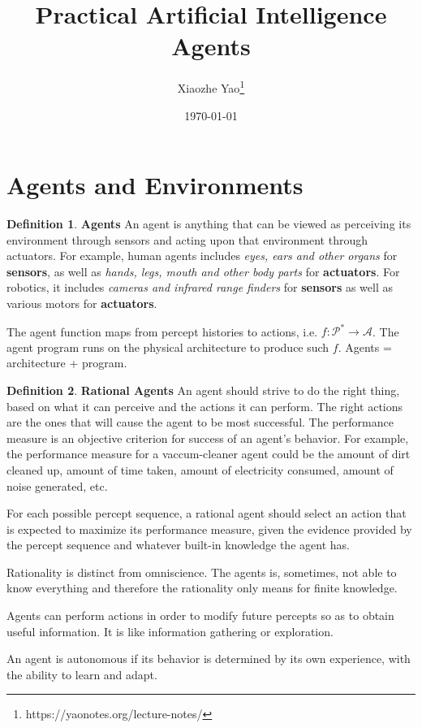 \documentclass{article}
\title{Practical Artificial Intelligence \\ Agents}
\author{Xiaozhe Yao\footnote{https://yaonotes.org/lecture-notes/}}
\date{\today}
\theoremstyle{definition}
\newtheorem{defi}{Definition}[section]
\begin{document}
\maketitle
\section{Agents and Environments}
\begin{defi}
\textbf{Agents} An agent is anything that can be viewed as perceiving its environment through sensors and acting upon that environment through actuators. For example, human agents includes \textit{eyes, ears and other organs} for \textbf{sensors}, as well as \textit{hands, legs, mouth and other body parts} for \textbf{actuators}. For robotics, it includes \textit{cameras and infrared range finders} for \textbf{sensors} as well as various motors for \textbf{actuators}.

The agent function maps from percept histories to actions, i.e. $f: \mathcal{P}^{*}\to \mathcal{A}$. The agent program runs on the physical architecture to produce such $f$. Agents = architecture + program.
\end{defi}

\begin{defi}
\textbf{Rational Agents} An agent should strive to do the right thing, based on what it can perceive and the actions it can perform. The right actions are the ones that will cause the agent to be most successful. The performance measure is an objective criterion for success of an agent's behavior. For example, the performance measure for a vaccum-cleaner agent could be the amount of dirt cleaned up, amount of time taken, amount of electricity consumed, amount of noise generated, etc.

For each possible percept sequence, a rational agent should select an action that is expected to maximize its performance measure, given the evidence provided by the percept sequence and whatever built-in knowledge the agent has.

Rationality is distinct from omniscience. The agents is, sometimes, not able to know everything and therefore the rationality only means for finite knowledge.

Agents can perform actions in order to modify future percepts so as to obtain useful information. It is like information gathering or exploration.

An agent is autonomous if its behavior is determined by its own experience, with the ability to learn and adapt.
\end{defi}
\end{document}
